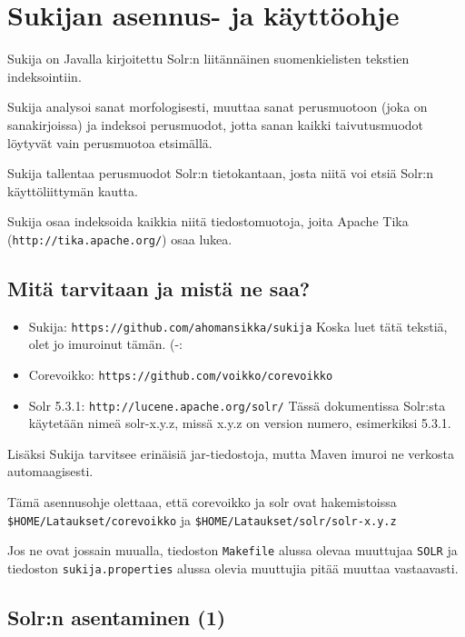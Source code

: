 \documentclass[12pt]{article}
\begin{document}
\pagestyle{fancy}
\setlength{\parindent}{0pt}
\setlength{\parskip}{1ex plus 0.5ex minus 0.2ex}
\section*{Sukijan asennus- ja käyttöohje}


Sukija on Javalla kirjoitettu Solr:n liitännäinen suomenkielisten
tekstien indeksointiin.

Sukija analysoi sanat morfologisesti, muuttaa sanat perusmuotoon (joka
on sanakirjoissa) ja indeksoi perusmuodot, jotta sanan kaikki
taivutusmuodot löytyvät vain perusmuotoa etsimällä.

Sukija tallentaa perusmuodot Solr:n tietokantaan, josta niitä voi
etsiä Solr:n käyttöliittymän kautta.

Sukija osaa indeksoida kaikkia niitä tiedostomuotoja, joita Apache
Tika (\verb=http://tika.apache.org/=) osaa lukea.

\subsection*{Mitä tarvitaan ja mistä ne saa?}

\begin{itemize}
\item Sukija:
      \verb=https://github.com/ahomansikka/sukija=
      Koska luet tätä tekstiä, olet jo imuroinut tämän. (-:

\item Corevoikko:
      \verb=https://github.com/voikko/corevoikko=

\item Solr 5.3.1:
      \verb=http://lucene.apache.org/solr/=
      Tässä dokumentissa Solr:sta käytetään nimeä solr-x.y.z,
      missä x.y.z on version numero, esimerkiksi 5.3.1.
\end{itemize}


Lisäksi Sukija tarvitsee erinäisiä jar-tiedostoja, mutta Maven imuroi
ne verkosta automaagisesti.

Tämä asennusohje olettaaa, että corevoikko ja solr ovat hakemistoissa
\verb=$HOME/Lataukset/corevoikko= ja
\verb=$HOME/Lataukset/solr/solr-x.y.z=

Jos ne ovat jossain muualla, tiedoston \verb=Makefile= alussa olevaa
muuttujaa \verb=SOLR= ja tiedoston \verb=sukija.properties= alussa
olevia muuttujia pitää muuttaa vastaavasti.


\subsection*{Solr:n asentaminen (1)}
\end{document}

